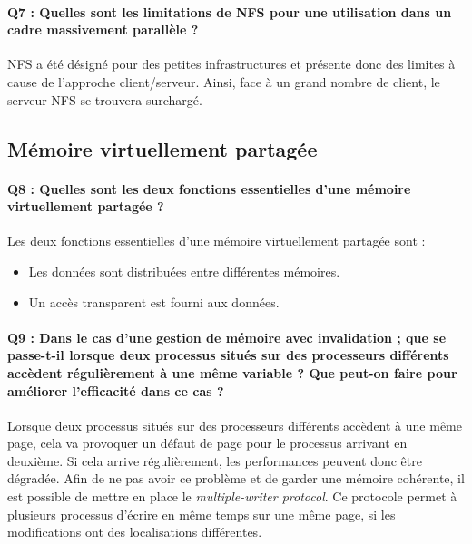 \documentclass[a4paper]{article}
\begin{document}
\paragraph{Q7 : Quelles sont les limitations de NFS pour une utilisation dans un cadre massivement parallèle ?}
NFS a été désigné pour des petites infrastructures et présente donc des limites à cause de l'approche client/serveur. Ainsi, face à un grand nombre de client, le serveur NFS se trouvera surchargé.

\subsection{Mémoire virtuellement partagée}

\paragraph{Q8 : Quelles sont les deux fonctions essentielles d'une mémoire virtuellement partagée ?}
Les deux fonctions essentielles d'une mémoire virtuellement partagée sont :
\begin{itemize}
\item Les données sont distribuées entre différentes mémoires.
\item Un accès transparent est fourni aux données.
\end{itemize}

\paragraph{Q9 : Dans le cas d'une gestion de mémoire avec invalidation ; que se passe-t-il lorsque deux processus situés sur des processeurs différents accèdent régulièrement à une même variable ? Que peut-on faire pour améliorer l'efficacité dans ce cas ?}
Lorsque deux processus situés sur des processeurs différents accèdent à une même page, cela va provoquer un défaut de page pour le processus arrivant en deuxième. Si cela arrive régulièrement, les performances peuvent donc être dégradée. Afin de ne pas avoir ce problème et de garder une mémoire cohérente, il est possible de mettre en place le \textit{multiple-writer protocol}. Ce protocole permet à plusieurs processus d'écrire en même temps sur une même page, si les modifications ont des localisations différentes.
\end{document}
